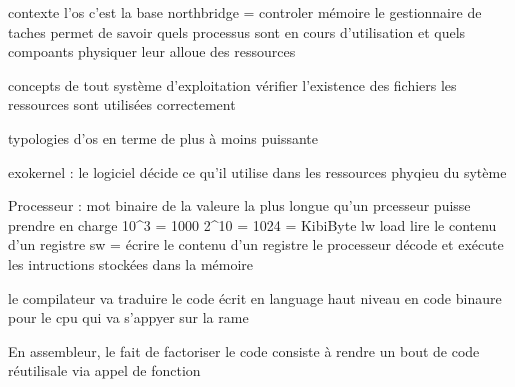contexte 
l'os c'est la base
northbridge = controler mémoire
le gestionnaire de taches permet de savoir quels processus sont en cours d'utilisation et quels compoants physiquer leur alloue des ressources



concepts de tout système d'exploitation
vérifier l'existence des fichiers 
les ressources sont utilisées correctement

typologies d'os
en terme de plus à moins puissante

exokernel : le logiciel décide ce qu'il utilise dans les ressources phyqieu du sytème

Processeur : mot binaire de la valeure la plus longue qu'un prcesseur puisse prendre en charge
10^3 = 1000
2^10 = 1024 = KibiByte
lw load lire le contenu d'un registre
sw = écrire le contenu d'un registre
le processeur décode et exécute les intructions stockées dans la mémoire

le compilateur va traduire le code écrit en language haut niveau en code binaure pour le cpu qui va s'appyer sur la rame


En assembleur, le fait de factoriser le code consiste à rendre un bout de code réutilisale via appel de fonction

